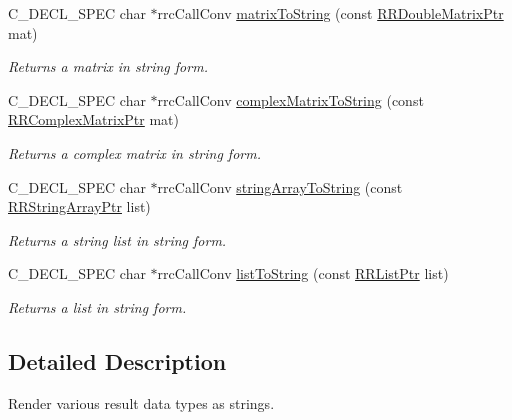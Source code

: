 \begin{DoxyCompactItemize}
C\-\_\-\-D\-E\-C\-L\-\_\-\-S\-P\-E\-C char $\ast$rrc\-Call\-Conv \hyperlink{group__to_string_ga02a9a7fee7703402fcf6e36f30d384be}{matrix\-To\-String} (const \hyperlink{rrc__types_8h_ae586a879d30f0823087e42d93464b5dd}{R\-R\-Double\-Matrix\-Ptr} mat)
\begin{DoxyCompactList}\small\item\em Returns a matrix in string form. \end{DoxyCompactList}\item 
C\-\_\-\-D\-E\-C\-L\-\_\-\-S\-P\-E\-C char $\ast$rrc\-Call\-Conv \hyperlink{group__to_string_gacb4e2892fead121b86bcaf22fea17178}{complex\-Matrix\-To\-String} (const \hyperlink{rrc__types_8h_a8cf9e865d8541d100f153800adbb7c3f}{R\-R\-Complex\-Matrix\-Ptr} mat)
\begin{DoxyCompactList}\small\item\em Returns a complex matrix in string form. \end{DoxyCompactList}\item 
C\-\_\-\-D\-E\-C\-L\-\_\-\-S\-P\-E\-C char $\ast$rrc\-Call\-Conv \hyperlink{group__to_string_ga57ac412ea941375e41f6cbc193c666e1}{string\-Array\-To\-String} (const \hyperlink{rrc__types_8h_a7c9475df6c7337d99482b13a365e7596}{R\-R\-String\-Array\-Ptr} list)
\begin{DoxyCompactList}\small\item\em Returns a string list in string form. \end{DoxyCompactList}\item 
C\-\_\-\-D\-E\-C\-L\-\_\-\-S\-P\-E\-C char $\ast$rrc\-Call\-Conv \hyperlink{group__to_string_ga7cfc863a3d8fec26c951a2f40fa7dfa4}{list\-To\-String} (const \hyperlink{rrc__types_8h_a32a8a60ac06858ff3a791672bd2bec73}{R\-R\-List\-Ptr} list)
\begin{DoxyCompactList}\small\item\em Returns a list in string form. \end{DoxyCompactList}\end{DoxyCompactItemize}


\subsection{Detailed Description}
Render various result data types as strings. 

